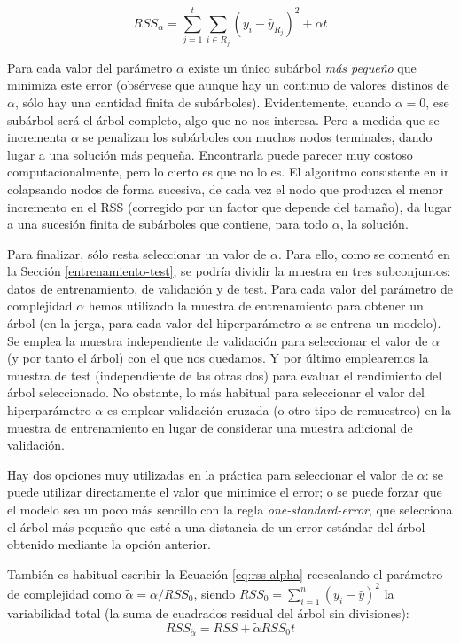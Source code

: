 \documentclass[
  spanish,
]{book}
\theoremstyle{break}
\theoremstyle{definition}
\theoremstyle{definition}
\theoremstyle{definition}
\theoremstyle{remark}
\begin{document}
\begin{equation} 
RSS_{\alpha} = \sum_{j=1}^t \sum_{i\in R_j} (y_i - \widehat y_{R_j})^2 + \alpha t
\label{eq:rss-alpha}
\end{equation}

Para cada valor del parámetro \(\alpha\) existe un único subárbol \emph{más pequeño}
que minimiza este error (obsérvese que aunque hay un continuo de valores
distinos de \(\alpha\), sólo hay una cantidad finita de subárboles).
Evidentemente, cuando \(\alpha = 0\), ese subárbol será el árbol completo, algo que
no nos interesa. Pero a medida que se incrementa \(\alpha\) se penalizan los subárboles
con muchos nodos terminales, dando lugar a una solución más pequeña.
Encontrarla puede parecer muy costoso computacionalmente, pero lo
cierto es que no lo es. El algoritmo consistente en ir colapsando nodos de forma
sucesiva, de cada vez el nodo que produzca el menor incremento en el RSS (corregido por
un factor que depende del tamaño), da
lugar a una sucesión finita de subárboles que contiene, para todo \(\alpha\), la
solución.

Para finalizar, sólo resta seleccionar un valor de \(\alpha\).
Para ello, como se comentó en la Sección \ref{entrenamiento-test}, se podría dividir la muestra en tres subconjuntos: datos de entrenamiento, de validación y de test.
Para cada valor del parámetro de complejidad \(\alpha\) hemos utilizado la muestra de entrenamiento para obtener un árbol
(en la jerga, para cada valor del hiperparámetro \(\alpha\) se entrena un modelo).
Se emplea la muestra independiente de validación para seleccionar el valor de \(\alpha\) (y por tanto el árbol) con el que nos quedamos.
Y por último emplearemos la muestra de test (independiente de las otras dos) para evaluar el rendimiento del árbol seleccionado.
No obstante, lo más habitual para seleccionar el valor del hiperparámetro \(\alpha\) es emplear validación cruzada (o otro tipo de remuestreo) en la muestra de entrenamiento en lugar de considerar una muestra adicional de validación.

Hay dos opciones muy utilizadas en la práctica para seleccionar el valor de \(\alpha\):
se puede utilizar directamente el valor que minimice el error; o se puede forzar
que el modelo sea un poco más sencillo con la regla \emph{one-standard-error}, que selecciona
el árbol más pequeño que esté a una distancia de un error estándar del árbol obtenido
mediante la opción anterior.

También es habitual escribir la Ecuación \eqref{eq:rss-alpha} reescalando el parámetro de complejidad como \(\tilde \alpha = \alpha / RSS_0\), siendo \(RSS_0 = \sum_{i=1}^{n} (y_i - \bar y)^2\) la variabilidad total (la suma de cuadrados residual del árbol sin divisiones):
\[RSS_{\tilde \alpha}=RSS + \tilde \alpha RSS_0 t\]
\end{document}
